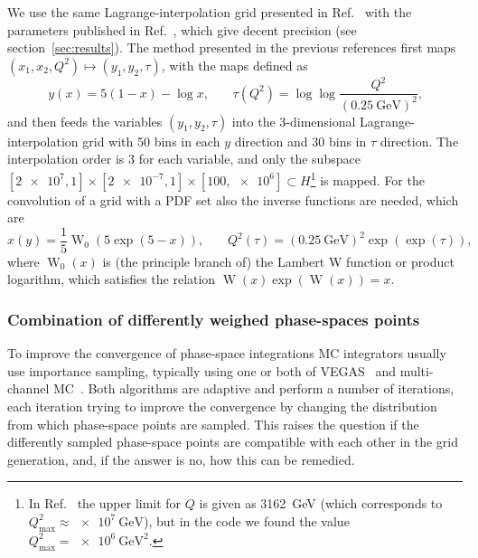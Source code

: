 We use the same Lagrange-interpolation grid presented in Ref.~\cite{Carli:2010rw} with the parameters published in Ref.~\cite{Bertone:2014zva}, which give decent precision (see section~\ref{sec:results}).
The method presented in the previous references first maps $(x_1, x_2, Q^2) \mapsto (y_1, y_2, \tau)$, with the maps defined as
\begin{equation}
y(x) = 5 (1-x) - \log x \text{,} \qquad \tau (Q^2) = \log \log \frac{Q^2}{(\SI{0.25}{\giga\electronvolt})^2} \text{,}
\end{equation}
and then feeds the variables $(y_1, y_2, \tau)$ into the 3-dimensional Lagrange-interpolation grid with 50 bins in each $y$ direction and 30 bins in $\tau$ direction.
The interpolation order is 3 for each variable, and only the subspace $[\num{2e7},1] \times [\num{2e-7},1] \times [100,\num{e6}] \subset H$\footnote{In Ref.~\cite{Bertone:2014zva} the upper limit for $Q$ is given as \SI{3162}{\giga\electronvolt} (which corresponds to $Q_\mathrm{max}^2 \approx \SI{e7}{\giga\electronvolt}$), but in the code we found the value $Q_\mathrm{max}^2 = \SI{e6}{\giga\electronvolt\squared}$.} is mapped.
For the convolution of a grid with a PDF set also the inverse functions are needed, which are
\begin{equation}
x(y) = \frac{1}{5} \operatorname{W}_0 (5 \exp (5-x)) \text{,} \qquad Q^2 (\tau) = (\SI{0.25}{\giga\electronvolt})^2 \exp (\exp (\tau)) \text{,}
\end{equation}
where $\operatorname{W}_0 (x)$ is (the principle branch of) the Lambert W function or product logarithm, which satisfies the relation $\operatorname{W} (x) \exp (\operatorname{W} (x)) = x$.

\subsubsection{Combination of differently weighed phase-spaces points}

To improve the convergence of phase-space integrations MC integrators usually use importance sampling, typically using one or both of VEGAS~\cite{} and multi-channel MC~\cite{}.
Both algorithms are adaptive and perform a number of iterations, each iteration trying to improve the convergence by changing the distribution from which phase-space points are sampled.
This raises the question if the differently sampled phase-space points are compatible with each other in the grid generation, and, if the answer is no, how this can be remedied.
